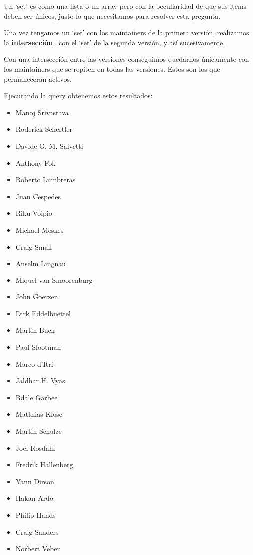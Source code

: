 \documentclass[a4paper, 12pt]{book}
\begin{document}
Un `set' es como una lista o un array pero con la peculiaridad de que sus items deben ser únicos, justo lo que necesitamos para resolver esta pregunta.

Una vez tengamos un `set' con los maintainers de la primera versión, realizamos la \textbf{intersección}~\cite{medium:_intersection} con el `set' de la segunda versión, y así sucesivamente. 

Con una intersección entre las versiones conseguimos quedarnos únicamente con los maintainers que se repiten en todas las versiones. Estos son los que permanecerán activos.

Ejecutando la query obtenemos estos resultados:
\begin{multicols}{3}
	\begin{itemize}
		\item Manoj Srivastava
		\item Roderick Schertler
		\item Davide G. M. Salvetti
		\item Anthony Fok
		\item Roberto Lumbreras
		\item Juan Cespedes
		\item Riku Voipio
		\item Michael Meskes
		\item Craig Small
		\item Anselm Lingnau
		\item Miquel van Smoorenburg
		\item John Goerzen
		\item Dirk Eddelbuettel
		\item Martin Buck
		\item Paul Slootman
		\item Marco d'Itri
		\item Jaldhar H. Vyas
		\item Bdale Garbee
		\item Matthias Klose
		\item Martin Schulze
		\item Joel Rosdahl
		\item Fredrik Hallenberg
		\item Yann Dirson
		\item Hakan Ardo
		\item Philip Hands
		\item Craig Sanders
		\item Norbert Veber
	\end{itemize}
\end{multicols}
\end{document}
